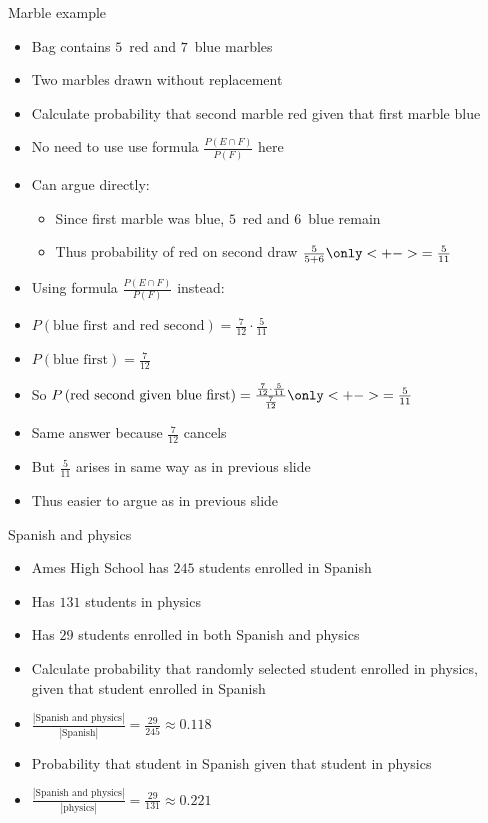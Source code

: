 \documentclass{beamer}
\theoremstyle{definition}
\begin{document}
\begin{frame}{Marble example}
\begin{itemize}
\item Bag contains $5$~red and $7$~blue marbles
\item Two marbles drawn without replacement
\item Calculate probability that second marble red
given that first marble blue
\item No need to use use formula
$\frac{P\left(E\cap F\right)}{P\left(F\right)}$ here
\item Can argue directly:
\begin{itemize}
\item Since first marble was blue, $5$~red and \alert{$6$~blue} remain
\item Thus probability of red on second draw $\frac{5}{5+6}
\only<+->{=\frac{5}{11}}$
\end{itemize}
\end{itemize}
\end{frame}

\begin{frame}
\begin{itemize}
\item Using formula
$\frac{P\left(E\cap F\right)}{P\left(F\right)}$ instead:
\item $P\left(\text{blue first and red second}\right)
=\frac{7}{12}\cdot\frac{5}{11}$
\item $P\left(\text{blue first}\right)=\frac{7}{12}$
\item So $P\left(\text{red second given blue first}\right)
=\frac{\frac{7}{12}\cdot\frac{5}{11}}{\frac{7}{12}}
\only<+->{=\frac{5}{11}}$
\item Same answer because $\frac{7}{12}$ cancels
\item But $\frac{5}{11}$ arises in same way as in previous slide
\item Thus easier to argue as in previous slide
\end{itemize}
\end{frame}


\begin{frame}{Spanish and physics}
\begin{itemize}
\item Ames High School has $245$ students enrolled in Spanish
\item Has $131$ students in physics
\item Has $29$ students enrolled in both Spanish and physics
\item Calculate probability that randomly selected student
enrolled in physics, given that student enrolled in Spanish
\item $\frac{\left|\text{Spanish and physics}\right|}
{\left|\text{Spanish}\right|}
=\frac{29}{245}\approx 0.118$
\item Probability that student in Spanish given that student in physics
\item $\frac{\left|\text{Spanish and physics}\right|}
{\left|\text{physics}\right|}
=\frac{29}{131}\approx 0.221$
\end{itemize}
\end{frame}
\end{document}
